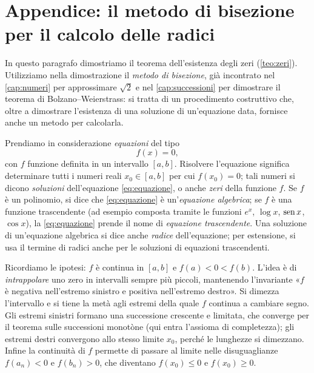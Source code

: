 \section{Appendice: il metodo di bisezione per il calcolo delle radici}
\label{sec:bisezione}

In questo paragrafo dimostriamo il teorema dell'esistenza degli zeri (\cref{teo:zeri}).
Utilizziamo nella dimostrazione il \emph{metodo di bisezione}, già incontrato nel
\cref{cap:numeri} per approssimare $\sqrt2$ e nel \cref{cap:successioni} per dimostrare
il teorema di Bolzano--Weierstrass: si tratta di un procedimento costruttivo che, oltre a
dimostrare l'esistenza di una soluzione di un'equazione data, fornisce anche un metodo
per calcolarla.

Prendiamo in considerazione \emph{equazioni} del tipo
\begin{equation}\label{eq:equazione}
  f(x)=0,
\end{equation}
con $f$ funzione definita in un intervallo $[a,b]$. Risolvere l'equazione significa
determinare tutti i numeri reali $x_{0}\in[a,b]$ per cui $f(x_{0})=0$; tali numeri si
dicono \emph{soluzioni} dell'equazione \eqref{eq:equazione}, o anche \emph{zeri} della
funzione $f$. Se $f$ è un polinomio, si dice che \eqref{eq:equazione} è un'\emph{equazione
algebrica}; se $f$ è una funzione trascendente (ad esempio composta tramite le funzioni
$e^{x}$, $\log x$, $\operatorname{sen} x$, $\cos x$), la \eqref{eq:equazione} prende il nome di
\emph{equazione trascendente}. Una soluzione di un'equazione algebrica si dice anche
\emph{radice} dell'equazione; per estensione, si usa il termine di radici anche per le
soluzioni di equazioni trascendenti.

\begin{strategia}
Ricordiamo le ipotesi: $f$ è continua in $[a,b]$ e $f(a)<0<f(b)$. L'idea è di
\emph{intrappolare} uno zero in intervalli sempre più piccoli, mantenendo l'invariante
«$f$ è negativa nell'estremo sinistro e positiva nell'estremo destro». Si dimezza
l'intervallo e si tiene la metà agli estremi della quale $f$ continua a cambiare segno.
Gli estremi sinistri formano una successione crescente e limitata, che converge per il
teorema sulle successioni monotòne (qui entra l'assioma di completezza); gli estremi
destri convergono allo stesso limite $x_{0}$, perché le lunghezze si dimezzano. Infine
la continuità di $f$ permette di passare al limite nelle disuguaglianze $f(a_{n})<0$ e
$f(b_{n})>0$, che diventano $f(x_{0})\le0$ e $f(x_{0})\ge0$.
\end{strategia}

